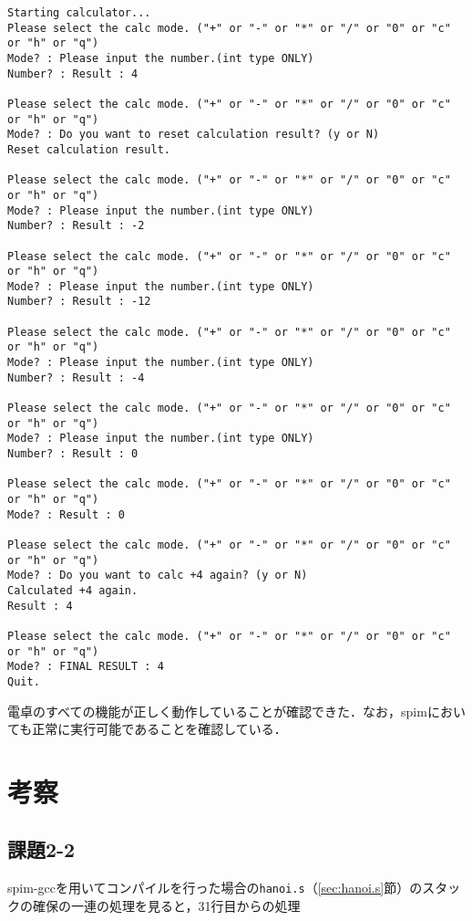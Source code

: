 \begin{Verbatim}[fontsize=\small, baselinestretch=0.8]
Starting calculator...
Please select the calc mode. ("+" or "-" or "*" or "/" or "0" or "c" or "h" or "q")
Mode? : Please input the number.(int type ONLY)
Number? : Result : 4

Please select the calc mode. ("+" or "-" or "*" or "/" or "0" or "c" or "h" or "q")
Mode? : Do you want to reset calculation result? (y or N)
Reset calculation result.

Please select the calc mode. ("+" or "-" or "*" or "/" or "0" or "c" or "h" or "q")
Mode? : Please input the number.(int type ONLY)
Number? : Result : -2

Please select the calc mode. ("+" or "-" or "*" or "/" or "0" or "c" or "h" or "q")
Mode? : Please input the number.(int type ONLY)
Number? : Result : -12

Please select the calc mode. ("+" or "-" or "*" or "/" or "0" or "c" or "h" or "q")
Mode? : Please input the number.(int type ONLY)
Number? : Result : -4

Please select the calc mode. ("+" or "-" or "*" or "/" or "0" or "c" or "h" or "q")
Mode? : Please input the number.(int type ONLY)
Number? : Result : 0

Please select the calc mode. ("+" or "-" or "*" or "/" or "0" or "c" or "h" or "q")
Mode? : Result : 0

Please select the calc mode. ("+" or "-" or "*" or "/" or "0" or "c" or "h" or "q")
Mode? : Do you want to calc +4 again? (y or N)
Calculated +4 again.
Result : 4

Please select the calc mode. ("+" or "-" or "*" or "/" or "0" or "c" or "h" or "q")
Mode? : FINAL RESULT : 4
Quit.
\end{Verbatim}

電卓のすべての機能が正しく動作していることが確認できた．なお，spimにおいても正常に実行可能であることを確認している．

\section{考察} \label{sec:review}

\subsection{課題2-2}
spim-gccを用いてコンパイルを行った場合の\verb|hanoi.s|（\ref{sec:hanoi.s}節）のスタックの確保の一連の処理を見ると，31行目からの処理


